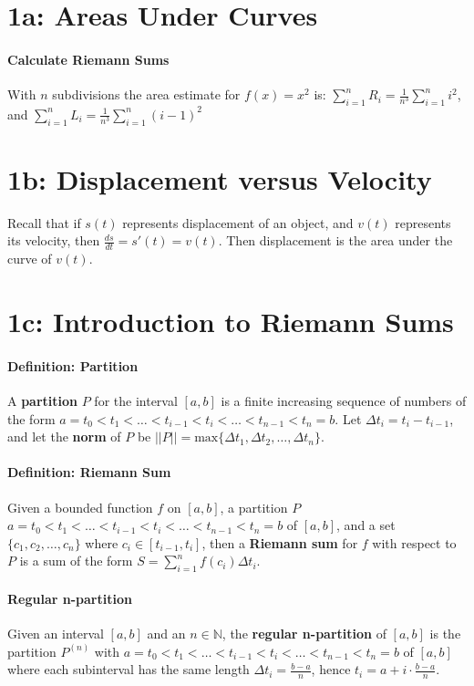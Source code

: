 \documentclass[10pt,letter]{article}
\begin{document}
\section*{1a: Areas Under Curves}
\paragraph{Calculate Riemann Sums} 
With $n$ subdivisions the area estimate for $f(x)=x^2$ is: $\sum_{i=1}^nR_i=\frac{1}{n^3}\sum_{i=1}^ni^2$, and $\sum_{i=1}^nL_i=\frac{1}{n^3}\sum_{i=1}^n(i-1)^2$

\section*{1b: Displacement versus Velocity}
Recall that if $s(t)$ represents displacement of an object, and $v(t)$ represents its velocity, then $\frac{ds}{dt}=s'(t)=v(t)$. Then displacement is the area under the curve of $v(t)$. 

\section*{1c: Introduction to Riemann Sums}
\paragraph{Definition: Partition} 
A \textbf{partition} $P$ for the interval $[a,b]$ is a finite increasing sequence of numbers of the form $a=t_0<t_1<\ldots<t_{i-1}<t_i<\ldots<t_{n-1}<t_n=b$. Let $\Delta t_i=t_i-t_{i-1}$, and let the \textbf{norm} of $P$ be $||P||=\text{max}\{\Delta t_1,\Delta t_2,\ldots,\Delta t_n\}$. 
\paragraph{Definition: Riemann Sum} 
Given a bounded function $f$ on $[a,b]$, a partition $P$ $a=t_0<t_1<\ldots<t_{i-1}<t_i<\ldots<t_{n-1}<t_n=b$ of $[a,b]$, and a set $\{c_1,c_2,\ldots,c_n\}$ where $c_i\in[t_{i-1},t_i]$, then a \textbf{Riemann sum} for $f$ with respect to $P$ is a sum of the form $S=\sum_{i=1}^nf(c_i)\Delta t_i$. 
\paragraph{Regular n-partition}
Given an interval $[a,b]$ and an $n\in\mathbb{N}$, the \textbf{regular n-partition} of $[a,b]$ is the partition $P^{(n)}$ with $a=t_0<t_1<\ldots<t_{i-1}<t_i<\ldots<t_{n-1}<t_n=b$ of $[a,b]$ where each subinterval has the same length $\Delta t_i=\frac{b-a}{n}$, hence $t_i=a+i\cdot\frac{b-a}{n}$. 
\end{document}

